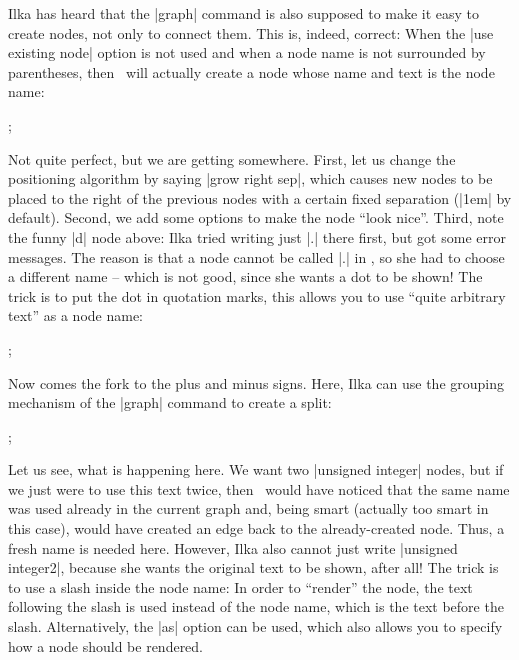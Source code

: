 Ilka has heard that the |graph| command is also supposed to make it
easy to create nodes, not only to connect them. This is, indeed,
correct: When the |use existing node| option is not used and when a
node name is not surrounded by parentheses, then \tikzname\ will
actually create a node whose name and text is the node name:
\begin{codeexample}[]
\tikz {};  
\end{codeexample}
Not quite perfect, but we are getting somewhere. First, let us change
the positioning algorithm by saying |grow right sep|, which causes new
nodes to be placed to the right of the previous nodes with a certain
fixed separation (|1em| by default). Second, we  add some options to
make the node ``look nice''. Third, note the funny |d| node above: Ilka
tried writing just |.| there first, but got some error messages. The
reason is that a node cannot be called |.| in \tikzname, so she had to
choose a different name -- which is not good, since she wants a dot to
be shown! The trick is to put the dot in quotation marks, this allows
you to use ``quite arbitrary text'' as a node name:
\begin{codeexample}[]
\tikz {};  
\end{codeexample}
Now comes the fork to the plus and minus signs. Here, Ilka can use the
grouping mechanism of the |graph| command to create a split:
\begin{codeexample}[]
\tikz {};  
\end{codeexample}
Let us see, what is happening here. We want two |unsigned integer|
nodes, but if we just were to use this text twice, then \tikzname\
would have noticed that the same name was used already in the current
graph and, being smart (actually too smart in this case), would have
created an edge back to the already-created node. Thus, a fresh name
is needed here. However, Ilka also cannot just write
|unsigned integer2|, because she wants the original text to be shown,
after all! The trick is to use a slash inside the node name: In
order to ``render'' the node, the text following the slash
is used instead of the node name, which is the text before the
slash. Alternatively, the |as| option can be used, which also 
allows you to specify how a node should be rendered.

